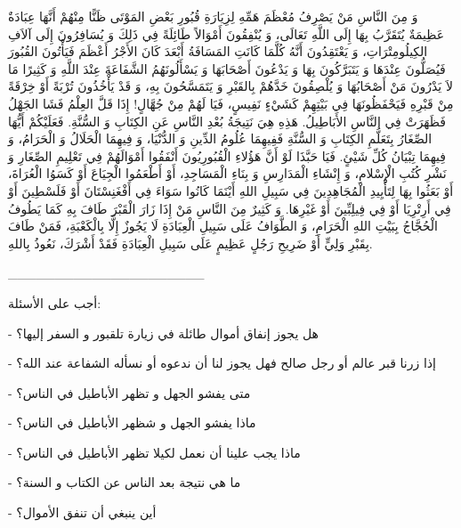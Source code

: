 \documentclass[a5paper]{article}
\begin{document}
وَ مِنَ النَّاسِ مَنْ يَصْرِفُ مُعْظَمَ هَمِّهِ لِزِيَارَةِ قُبُورِ بَعْضِ المَوْتَى ظَنًّا مِنْهُمْ أَنَّهَا عِبَادَةٌ عَظِيمَةٌ يُتَقَرَّبُ بِهَا إِلَى اللَّهِ تَعَالَى، وَ يُنْفِقُونَ أَمْوَالاً طَائِلَةً فِي ذَلِكَ وَ يُسَافِرُونَ إِلَى آلاَفِ الكِيلُومِتْرَاتِ، وَ يَعْتَقِدُونَ أَنَّهُ كُلَّمَا كَانَتِ المَسَافَةُ أَبْعَدَ كَانَ الأَجْرُ أَعْظَمَ فَيَأْتُونَ القُبُورَ فَيُصَلُّونَ عِنْدَهَا وَ يَتَبَرَّكُونَ بِهَا وَ يَدْعُونَ أَصْحَابَهَا وَ يَسْأَلُونَهُمُ الشَّفَاعَةَ عِنْدَ اللَّهِ وَ كَثِيرًا مَا لاَ يَدْرُونَ مَنْ أَصْحَابُهَا وَ يُلْصِقُونَ خَدَّهُمْ بِالقَبْرِ وَ يَتَمَسَّحُونَ بِهِ، وَ قَدْ يَأْخُذُونَ تُرْبَةً أَوْ خِرْقَةً مِنْ قَبْرِهِ فَيَحْفَظُونَهَا فِي بَيْتِهِمْ كَشَيْءٍ نَفِيسٍ، فَيَا لَهُمْ مِنْ جُهَّالٍ! إِذَا قَلَّ العِلْمُ فَشَا الجَهْلُ فَظَهَرَتْ فِي النَّاسِ الأَبَاطِيلُ. هَذِهِ هِيَ نَتِيجَةُ بُعْدِ النَّاسِ عَنِ الكِتَابِ وَ السُّنَّةِ. فَعَلَيْكُمْ أَيُّهَا الصِّغَارُ بِتَعَلُّمِ الكِتَابِ وَ السُّنَّةِ فَفِيهِمَا عُلُومُ الدِّينِ وَ الدُّنْيَا، وَ فِيهِمَا الْحَلَالُ وَ الْحَرَامُ، وَ فِيهِمَا تِبْيَانُ كُلِّ شَيْئٍ. فَيَا حَبَّذَا لَوْ أَنَّ هَؤُلاءِ الْقُبُورِيُونَ أَنْفَقُوا أَمْوَالَهُمْ فِي تَعْلِيمِ الصِّغَارِ وَ نَشْرِ كُتُبِ الْإِسْلامِ، وَ إِنْشَاءِ الْمَدَارِسِ وَ بِنَاءِ الْمَسَاجِدِ، أَوْ أَطْعَمُوا الْجِيَاعَ أَوْ كَسَوُا الْعُرَاةَ، أَوْ بَعَثُوا بِهَا لِتَأْيِيدِ الْمُجَاهِدِينَ فِي سَبِيلِ اللهِ أَيْنَمَا كَانُوا سَوَاءَ فِي أَفْغَنِسْتَانَ أَوْ فَلَسْطِينَ أَوْ فِي أَرِتْرِيَا أَوْ فِي فِيلِبِّينَ أَوْ غَيْرِهَا. وَ كَثِيرٌ مِنَ النَّاسِ مَنْ إِذَا زَارَ الْقَبْرَ طَافَ بِهِ كَمَا يَطُوفُ الْحُجَّاجُ بِبَيْتِ اللهِ الْحَرَامِ، وَ الطَّوَافُ عَلَى سَبِيلِ الْعِبَادَةِ لَا يَجُوزٌ إِلَّا بِالْكَعْبَةِ، فَمَنْ طَافَ بِقَبْرِ وَلِيٍّ أَوْ ضَرِيحِ رَجُلٍ عَظِيمٍ عَلَى سَبِيلِ الْعِبَادَةِ فَقَدْ أَشْرَكَ، نَعُوذُ بِاللهِ.

\_\_\_\_\_\_\_\_\_\_\_\_\_\_\_\_\_\_\_\_\_

أجب على الأسئلة:

- هل يجوز إنفاق أموال طائلة في زيارة تلقبور و السفر إليها؟

- إذا زرنا قبر عالم أو رجل صالح فهل يجوز لنا أن ندعوه أو نسأله الشفاعة عند الله؟

- متى يفشو الجهل و تظهر الأباطيل في الناس؟

- ماذا يفشو الجهل و شظهر الأباطيل في الناس؟

- ماذا يجب علينا أن نعمل لكيلا تظهر الأباطيل في الناس؟

- ما هي نتيجة بعد الناس عن الكتاب و السنة؟

- أين ينبغي أن تنفق الأموال؟
\end{document}
